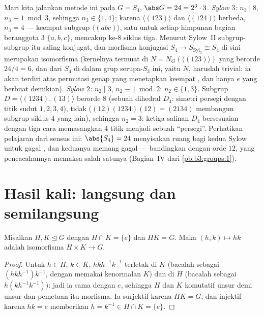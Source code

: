 \begin{example}
\label{ex:b3:groups:s4sylow}
Mari kita jalankan metode ini pada $G = S_4$, $\abs G = 24 = 2^3\cdot3$.
\emph{Sylow $3$:} $n_3 \mid 8$, $n_3 \equiv 1 \bmod 3$, sehingga $n_3
\in \{1, 4\}$; karena $\langle(123)\rangle$ dan
$\langle(124)\rangle$ berbeda, $n_3 = 4$ --- keempat
subgrup $\langle(abc)\rangle$, satu untuk setiap himpunan bagian beranggota $3$
$\{a, b, c\}$, mencakup ke-$8$ siklus tiga. Menurut Sylow~II
subgrup-subgrup itu saling konjugat, dan morfisma konjugasi $S_4 \to
S_{\mathrm{Syl}_3} \cong S_4$ di sini merupakan isomorfisma (kernelnya
termuat di $N = N_G(\langle(123)\rangle)$ yang berorde $24/4 =
6$, dan  dari $S_4$ di dalam grup serupa-$S_3$ ini, yaitu $N$, haruslah
trivial: ia akan terdiri atas permutasi genap yang menetapkan keempat
, dan hanya $e$ yang berbuat demikian). \emph{Sylow $2$:} $n_2 \mid 3$, $n_2
\equiv 1 \bmod 2$: $n_2 \in \{1, 3\}$. Subgrup $D =
\langle(1234), (13)\rangle$ berorde $8$ (sebuah dihedral $D_4$:
simetri persegi dengan titik sudut $1, 2, 3, 4$), tidak
 ($(12)(1234)(12) = (2134)$ membangun subgrup siklus-$4$
yang lain), sehingga $n_2 = 3$: ketiga salinan $D_4$
bersesuaian dengan tiga cara memasangkan $4$ titik menjadi sebuah
``persegi''. Perhatikan pelajaran dari sensus ini: $\abs{S_4} = 24$
menyisakan ruang bagi kedua Sylow untuk gagal , dan keduanya memang gagal ---
bandingkan dengan orde $12$, yang pencacahannya memaksa salah satunya 
(Bagian~IV dari \cref{pb:b3:groups:1}).
\end{example}

\section{Hasil kali: langsung dan semilangsung}

\begin{proposition}\label{prop:b3:groups:direct}
Misalkan $H, K \trianglelefteq G$ dengan $H \cap K = \{e\}$ dan $HK = G$.
Maka $(h,k) \mapsto hk$ adalah isomorfisma $H \times K \to
G$.
\end{proposition}

\begin{proof}
Untuk $h \in H$, $k \in K$,  $hkh^{-1}k^{-1}$ terletak di
$K$ (bacalah sebagai $(hkh^{-1})k^{-1}$, dengan memakai kenormalan $K$) dan di
$H$ (bacalah sebagai $h(kh^{-1}k^{-1})$): jadi ia sama dengan $e$, sehingga $H$ dan $K$
komutatif unsur demi unsur dan pemetaan itu morfisma. Ia surjektif
karena $HK = G$, dan injektif karena $hk = e$ memberikan $h = k^{-1} \in
H \cap K = \{e\}$.
\end{proof}

